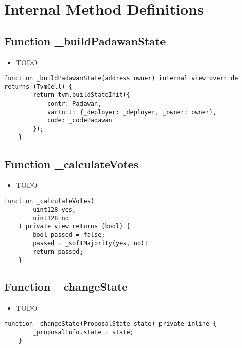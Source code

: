 \section{Internal Method Definitions}


\subsection{Function \_{}buildPadawanState}

\begin{itemize}
\item TODO
\end{itemize}

\begin{lstlisting}[firstnumber=183]
    function _buildPadawanState(address owner) internal view override returns (TvmCell) {
        return tvm.buildStateInit({
            contr: Padawan,
            varInit: {_deployer: _deployer, _owner: owner},
            code: _codePadawan
        });
    }
\end{lstlisting}

\subsection{Function \_{}calculateVotes}

\begin{itemize}
\item TODO
\end{itemize}

\begin{lstlisting}[firstnumber=161]
    function _calculateVotes(
        uint128 yes,
        uint128 no
    ) private view returns (bool) {
        bool passed = false;
        passed = _softMajority(yes, no);
        return passed;
    }
\end{lstlisting}

\subsection{Function \_{}changeState}

\begin{itemize}
\item TODO
\end{itemize}

\begin{lstlisting}[firstnumber=179]
    function _changeState(ProposalState state) private inline {
        _proposalInfo.state = state;
    }
\end{lstlisting}

